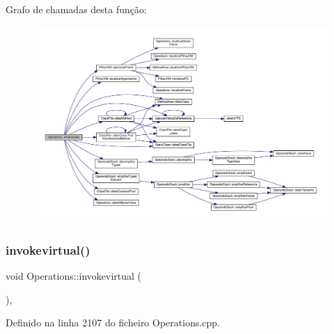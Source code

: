 Grafo de chamadas desta função\+:
\nopagebreak
\begin{figure}[H]
\begin{center}
\leavevmode
\includegraphics[width=350pt]{classOperations_a562d8c9cc5975de2ee6d1a95e1969724_cgraph}
\end{center}
\end{figure}
\mbox{\label{classOperations_acf53d7e184b8828702b4d5036ef0a7a9}} 
\subsubsection{\texorpdfstring{invokevirtual()}{invokevirtual()}}
{\footnotesize\ttfamily void Operations\+::invokevirtual (\begin{DoxyParamCaption}{ }\end{DoxyParamCaption})\hspace{0.3cm}{\ttfamily [static]}, {\ttfamily [private]}}



Definido na linha 2107 do ficheiro Operations.\+cpp.



